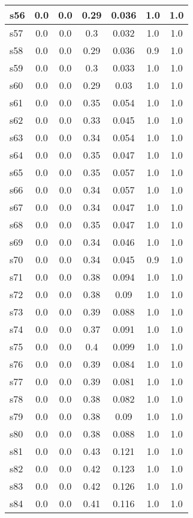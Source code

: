\documentclass{article}
\begin{document}
\begin{tabular}{|l|c|c|c|c|c|c|}
\hline
s56 &0.0 & 0.0 & 0.29 & 0.036 & 1.0 & 1.0\\
\hline
s57 &0.0 & 0.0 & 0.3 & 0.032 & 1.0 & 1.0\\
\hline
s58 &0.0 & 0.0 & 0.29 & 0.036 & 0.9 & 1.0\\
\hline
s59 &0.0 & 0.0 & 0.3 & 0.033 & 1.0 & 1.0\\
\hline
s60 &0.0 & 0.0 & 0.29 & 0.03 & 1.0 & 1.0\\
\hline
s61 &0.0 & 0.0 & 0.35 & 0.054 & 1.0 & 1.0\\
\hline
s62 &0.0 & 0.0 & 0.33 & 0.045 & 1.0 & 1.0\\
\hline
s63 &0.0 & 0.0 & 0.34 & 0.054 & 1.0 & 1.0\\
\hline
s64 &0.0 & 0.0 & 0.35 & 0.047 & 1.0 & 1.0\\
\hline
s65 &0.0 & 0.0 & 0.35 & 0.057 & 1.0 & 1.0\\
\hline
s66 &0.0 & 0.0 & 0.34 & 0.057 & 1.0 & 1.0\\
\hline
s67 &0.0 & 0.0 & 0.34 & 0.047 & 1.0 & 1.0\\
\hline
s68 &0.0 & 0.0 & 0.35 & 0.047 & 1.0 & 1.0\\
\hline
s69 &0.0 & 0.0 & 0.34 & 0.046 & 1.0 & 1.0\\
\hline
s70 &0.0 & 0.0 & 0.34 & 0.045 & 0.9 & 1.0\\
\hline
s71 &0.0 & 0.0 & 0.38 & 0.094 & 1.0 & 1.0\\
\hline
s72 &0.0 & 0.0 & 0.38 & 0.09 & 1.0 & 1.0\\
\hline
s73 &0.0 & 0.0 & 0.39 & 0.088 & 1.0 & 1.0\\
\hline
s74 &0.0 & 0.0 & 0.37 & 0.091 & 1.0 & 1.0\\
\hline
s75 &0.0 & 0.0 & 0.4 & 0.099 & 1.0 & 1.0\\
\hline
s76 &0.0 & 0.0 & 0.39 & 0.084 & 1.0 & 1.0\\
\hline
s77 &0.0 & 0.0 & 0.39 & 0.081 & 1.0 & 1.0\\
\hline
s78 &0.0 & 0.0 & 0.38 & 0.082 & 1.0 & 1.0\\
\hline
s79 &0.0 & 0.0 & 0.38 & 0.09 & 1.0 & 1.0\\
\hline
s80 &0.0 & 0.0 & 0.38 & 0.088 & 1.0 & 1.0\\
\hline
s81 &0.0 & 0.0 & 0.43 & 0.121 & 1.0 & 1.0\\
\hline
s82 &0.0 & 0.0 & 0.42 & 0.123 & 1.0 & 1.0\\
\hline
s83 &0.0 & 0.0 & 0.42 & 0.126 & 1.0 & 1.0\\
\hline
s84 &0.0 & 0.0 & 0.41 & 0.116 & 1.0 & 1.0\\

\end{tabular}
\end{document}
